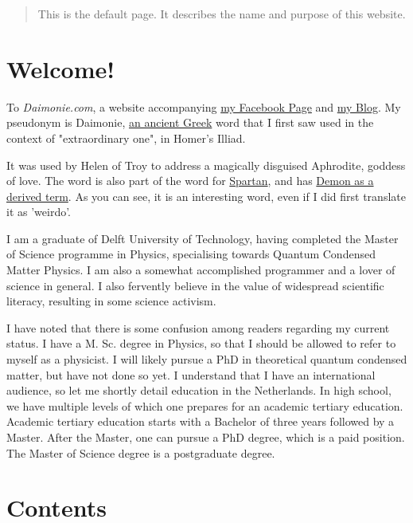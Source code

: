 \begin{abstract}
    This is the default page. It describes the name and purpose of this website.
\end{abstract}


\begin{multicols}{2}

\section{Welcome!} 


To \emph{Daimonie.com}, a website accompanying \href{https://www.facebook.com/daimonie}{my Facebook Page} and
\href{./blog"}{my Blog}. My pseudonym is Daimonie,
\href{https://goo.gl/xwLXc1}{an ancient Greek} word
that I first saw used in  the context of "extraordinary one", in Homer's Illiad.  


It was used by Helen of Troy to address a magically disguised Aphrodite, goddess of love. The word is also part of the word for
\href{https://goo.gl/kktWCr}{Spartan}, and has \href{https://goo.gl/sKxvMo}{Demon as a derived term}. As you can see, it is an interesting word, even if I did first translate it as 'weirdo'.

I am a graduate of Delft University of Technology, having completed the Master of Science programme in Physics, specialising towards
Quantum Condensed Matter Physics. I am also a somewhat accomplished programmer and a lover of science in general. I also fervently believe
in the value of widespread scientific literacy, resulting in some science activism. 

I have noted that there is some confusion among readers regarding my current status. I have a M. Sc. degree in Physics, so that I should be
allowed to refer to myself as a physicist. I will likely pursue a PhD in theoretical quantum condensed matter, but have not done so yet. I understand
that I have an international audience, so let me shortly detail education in the Netherlands. In high school, we have multiple levels of which
one prepares for an academic tertiary education. Academic tertiary education starts with a Bachelor of three years followed by a Master.
After the Master, one can pursue a PhD degree, which is a paid position. The Master of Science degree is a postgraduate degree.


\section{	Contents } 



\end{multicols}
